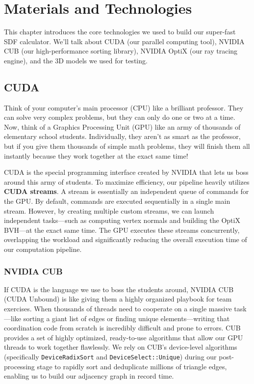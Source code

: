 \chapter{Materials and Technologies}

This chapter introduces the core technologies we used to build our super-fast SDF calculator. We'll talk about CUDA (our parallel computing tool), NVIDIA CUB (our high-performance sorting library), NVIDIA OptiX (our ray tracing engine), and the 3D models we used for testing.

\section{CUDA}

Think of your computer's main processor (CPU) like a brilliant professor. They can solve very complex problems, but they can only do one or two at a time. Now, think of a Graphics Processing Unit (GPU) like an army of thousands of elementary school students. Individually, they aren't as smart as the professor, but if you give them thousands of simple math problems, they will finish them all instantly because they work together at the exact same time!

CUDA \cite{cuda} is the special programming interface created by NVIDIA that lets us boss around this army of students. To maximize efficiency, our pipeline heavily utilizes \textbf{CUDA streams}. A stream is essentially an independent queue of commands for the GPU. By default, commands are executed sequentially in a single main stream. However, by creating multiple custom streams, we can launch independent tasks---such as computing vertex normals and building the OptiX BVH---at the exact same time. The GPU executes these streams concurrently, overlapping the workload and significantly reducing the overall execution time of our computation pipeline.

\subsection{NVIDIA CUB}

If CUDA is the language we use to boss the students around, NVIDIA CUB (CUDA Unbound) \cite{cub} is like giving them a highly organized playbook for team exercises. When thousands of threads need to cooperate on a single massive task---like sorting a giant list of edges or finding unique elements---writing that coordination code from scratch is incredibly difficult and prone to errors. CUB provides a set of highly optimized, ready-to-use algorithms that allow our GPU threads to work together flawlessly. We rely on CUB's device-level algorithms (specifically \texttt{DeviceRadixSort} and \texttt{DeviceSelect::Unique}) during our post-processing stage to rapidly sort and deduplicate millions of triangle edges, enabling us to build our adjacency graph in record time.

